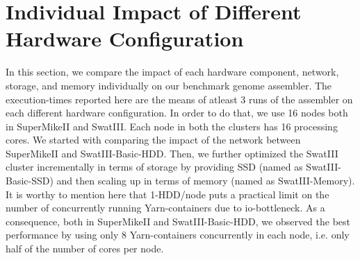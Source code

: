 \documentclass[conference]{IEEEtran}
\begin{document}
\section {Individual Impact of Different Hardware Configuration} \label{IndividualImpactofDifferentHardwareConfiguration}
In this section, we compare the impact of each hardware component, network, storage, and memory individually on our benchmark genome assembler.
The execution-times reported here are the means of atleast 3 runs of the assembler on each different hardware configuration.
In order to do that, we use 16 nodes both in SuperMikeII and SwatIII. Each node in both the clusters has 16 processing cores.
We started with comparing the impact of the network between SuperMikeII and SwatIII-Basic-HDD.
Then, we further optimized the SwatIII cluster incrementally in terms of storage by providing SSD (named as SwatIII-Basic-SSD) and then scaling up in terms of memory (named as SwatIII-Memory).
It is worthy to mention here that 1-HDD/node puts a practical limit on the number of concurrently running Yarn-containers due to io-bottleneck.
As a consequence, both in SuperMikeII and SwatIII-Basic-HDD, we observed the best performance by using only 8 Yarn-containers concurrently in each node, i.e. only half of the number of cores per node.
\label{IndividualHWEffect}
\end{document}
